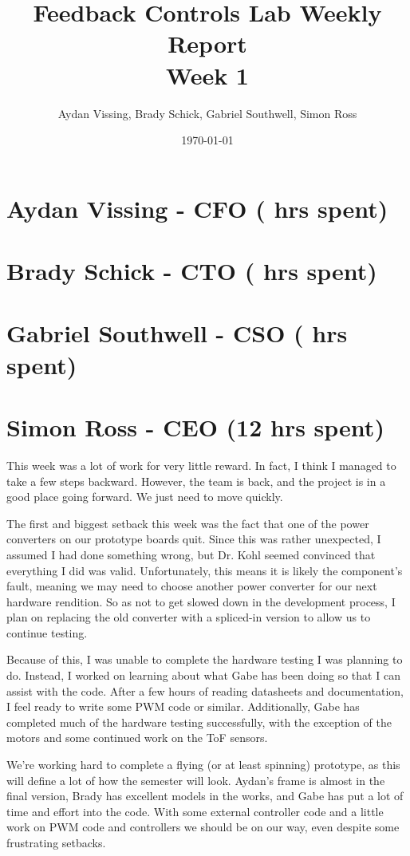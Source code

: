\documentclass[12pt, titlepage]{article}
\title{Feedback Controls Lab Weekly Report \\ \normalsize{Week 1}}
\author{Aydan Vissing, Brady Schick, Gabriel Southwell, Simon Ross}
\date{\today}
\begin{document}
\maketitle

\section*{Aydan Vissing - CFO ( hrs spent)}



\section*{Brady Schick - CTO ( hrs spent)}



\section*{Gabriel Southwell - CSO ( hrs spent)}



\section*{Simon Ross - CEO (12 hrs spent)}

This week was a lot of work for very little reward. In fact, I think I managed to take a few steps backward. However, the team is back, and the project is in a good place going forward. We just need to move quickly.

The first and biggest setback this week was the fact that one of the power converters on our prototype boards quit. Since this was rather unexpected, I assumed I had done something wrong, but Dr. Kohl seemed convinced that everything I did was valid. Unfortunately, this means it is likely the component's fault, meaning we may need to choose another power converter for our next hardware rendition. So as not to get slowed down in the development process, I plan on replacing the old converter with a spliced-in version to allow us to continue testing. 

Because of this, I was unable to complete the hardware testing I was planning to do. Instead, I worked on learning about what Gabe has been doing so that I can assist with the code. After a few hours of reading datasheets and documentation, I feel ready to write some PWM code or similar. Additionally, Gabe has completed much of the hardware testing successfully, with the exception of the motors and some continued work on the ToF sensors.

We're working hard to complete a flying (or at least spinning) prototype, as this will define a lot of how the semester will look. Aydan's frame is almost in the final version, Brady has excellent models in the works, and Gabe has put a lot of time and effort into the code. With some external controller code and a little work on PWM code and controllers we should be on our way, even despite some frustrating setbacks.
\end{document}
